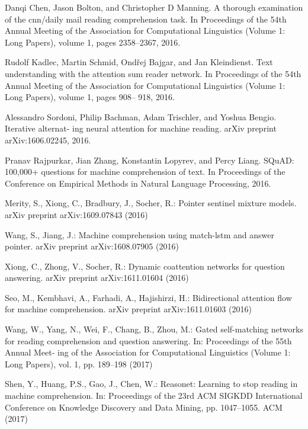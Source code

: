 \documentclass{article}
\begin{document}
\begin{thebibliography}{99}
    Danqi Chen, Jason Bolton, and Christopher D Manning. A thorough examination of the
    cnn/daily mail reading comprehension task. In Proceedings of the 54th Annual Meeting of
    the Association for Computational Linguistics (Volume 1: Long Papers), volume 1, pages
    2358–2367, 2016.

    Rudolf Kadlec, Martin Schmid, Ondřej Bajgar, and Jan Kleindienst. Text understanding
    with the attention sum reader network. In Proceedings of the 54th Annual Meeting of the
    Association for Computational Linguistics (Volume 1: Long Papers), volume 1, pages 908–
    918, 2016.

    Alessandro Sordoni, Philip Bachman, Adam Trischler, and Yoshua Bengio. Iterative alternat-
    ing neural attention for machine reading. arXiv preprint arXiv:1606.02245, 2016.

    Pranav Rajpurkar, Jian Zhang, Konstantin Lopyrev, and Percy Liang. SQuAD: 100,000+ questions
    for machine comprehension of text. In Proceedings of the Conference on Empirical Methods in
    Natural Language Processing, 2016.

    Merity, S., Xiong, C., Bradbury, J., Socher, R.: Pointer sentinel mixture models. arXiv
    preprint arXiv:1609.07843 (2016)

    Wang, S., Jiang, J.: Machine comprehension using match-lstm and answer pointer. arXiv
    preprint arXiv:1608.07905 (2016)

    Xiong, C., Zhong, V., Socher, R.: Dynamic coattention networks for question answering.
    arXiv preprint arXiv:1611.01604 (2016)

    Seo, M., Kembhavi, A., Farhadi, A., Hajishirzi, H.: Bidirectional attention flow for machine
    comprehension. arXiv preprint arXiv:1611.01603 (2016)
    
    Wang, W., Yang, N., Wei, F., Chang, B., Zhou, M.: Gated self-matching networks for
    reading comprehension and question answering. In: Proceedings of the 55th Annual Meet-
    ing of the Association for Computational Linguistics (Volume 1: Long Papers), vol. 1, pp.
    189–198 (2017)

    Shen, Y., Huang, P.S., Gao, J., Chen, W.: Reasonet: Learning to stop reading in machine
    comprehension. In: Proceedings of the 23rd ACM SIGKDD International Conference on
    Knowledge Discovery and Data Mining, pp. 1047–1055. ACM (2017)


\end{thebibliography}
\end{document}
